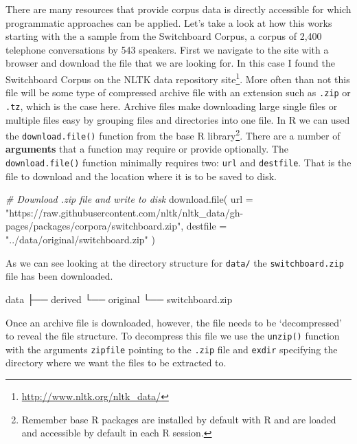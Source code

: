 \documentclass[
  letterpaper,
]{latex/krantz}
\newenvironment{Shaded}{\begin{snugshade}}{\end{snugshade}}
\newcommand{\AttributeTok}[1]{\textcolor[rgb]{0.00,0.00,0.00}{#1}}
\newcommand{\CommentTok}[1]{\textcolor[rgb]{0.00,0.00,0.00}{\textit{#1}}}
\newcommand{\ExtensionTok}[1]{\textcolor[rgb]{0.00,0.00,0.00}{#1}}
\newcommand{\FunctionTok}[1]{\textcolor[rgb]{0.00,0.00,0.00}{#1}}
\newcommand{\NormalTok}[1]{\textcolor[rgb]{0.00,0.00,0.00}{#1}}
\newcommand{\StringTok}[1]{\textcolor[rgb]{0.00,0.00,0.00}{#1}}
\DeclareRobustCommand{\href}[2]{#2\footnote{\url{#1}}}
\begin{document}
There are many resources that provide corpus data is directly accessible
for which programmatic approaches can be applied. Let's take a look at
how this works starting with the a sample from the Switchboard Corpus, a
corpus of 2,400 telephone conversations by 543 speakers. First we
navigate to the site with a browser and download the file that we are
looking for. In this case I found the Switchboard Corpus on the
\href{http://www.nltk.org/nltk_data/}{NLTK data repository site}. More
often than not this file will be some type of compressed archive file
with an extension such as \texttt{.zip} or \texttt{.tz}, which is the
case here. Archive files make downloading large single files or multiple
files easy by grouping files and directories into one file. In R we can
used the \texttt{download.file()} function from the base R
library\footnote{Remember base R packages are installed by default with
  R and are loaded and accessible by default in each R session.}. There
are a number of \textbf{arguments} that a function may require or
provide optionally. The \texttt{download.file()} function minimally
requires two: \texttt{url} and \texttt{destfile}. That is the file to
download and the location where it is to be saved to disk.

\begin{Shaded}
\begin{Highlighting}[]
\CommentTok{\# Download .zip file and write to disk}
\FunctionTok{download.file}\NormalTok{(}
  \AttributeTok{url =} \StringTok{"https://raw.githubusercontent.com/nltk/nltk\_data/gh{-}pages/packages/corpora/switchboard.zip"}\NormalTok{,}
  \AttributeTok{destfile =} \StringTok{"../data/original/switchboard.zip"}
\NormalTok{)}
\end{Highlighting}
\end{Shaded}

As we can see looking at the directory structure for \texttt{data/} the
\texttt{switchboard.zip} file has been downloaded.

\begin{Shaded}
\begin{Highlighting}[]
\ExtensionTok{data}
\ExtensionTok{├──}\NormalTok{ derived}
\ExtensionTok{└──}\NormalTok{ original}
    \ExtensionTok{└──}\NormalTok{ switchboard.zip}
\end{Highlighting}
\end{Shaded}

Once an archive file is downloaded, however, the file needs to be
`decompressed' to reveal the file structure. To decompress this file we
use the \texttt{unzip()} function with the arguments \texttt{zipfile}
pointing to the \texttt{.zip} file and \texttt{exdir} specifying the
directory where we want the files to be extracted to.
\end{document}
